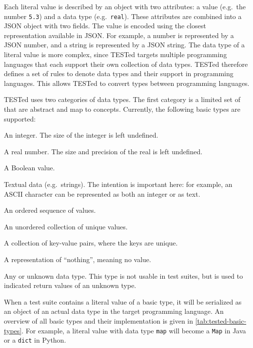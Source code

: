 \documentclass[../main]{subfiles}
\begin{document}
Each literal value is described by an object with two attributes: a value (e.g.\ the number \texttt{5.3}) and a data type (e.g.\ \texttt{real}).
These attributes are combined into a JSON object with two fields.
The value is encoded using the closest representation available in JSON\@.
For example, a number is represented by a JSON number, and a string is represented by a JSON string.
The data type of a literal value is more complex, since TESTed targets multiple programming languages that each support their own collection of data types.
TESTed therefore defines a set of rules to denote data types and their support in programming languages.
This allows TESTed to convert types between programming languages.

TESTed uses two categories of data types.
The first category is a limited set of  that are abstract and map to concepts.
Currently, the following basic types are supported:

\begin{description}[noitemsep]
    \item[\texttt{integer}] An integer. The size of the integer is left undefined.
    \item[\texttt{real}] A real number. The size and precision of the real is left undefined.
    \item[\texttt{boolean}] A Boolean value.
    \item[\texttt{text}] Textual data (e.g.\ strings).
          The intention is important here: for example, an ASCII character can be represented as both an integer or as text.
    \item[\texttt{sequence}] An ordered sequence of values.
    \item[\texttt{set}] An unordered collection of unique values.
    \item[\texttt{map}] A collection of key-value pairs, where the keys are unique.
    \item[\texttt{nothing}] A representation of ``nothing'', meaning no value.
    \item[\texttt{any}] Any or unknown data type.
         This type is not usable in test suites, but is used to indicated return values of an unknown type.
\end{description}

When a test suite contains a literal value of a basic type, it will be serialized as an object of an actual data type in the target programming language.
An overview of all basic types and their implementation is given in \cref{tab:tested-basic-types}.
For example, a literal value with data type \texttt{map} will become a \texttt{Map} in Java or a \texttt{dict} in Python.
\end{document}
